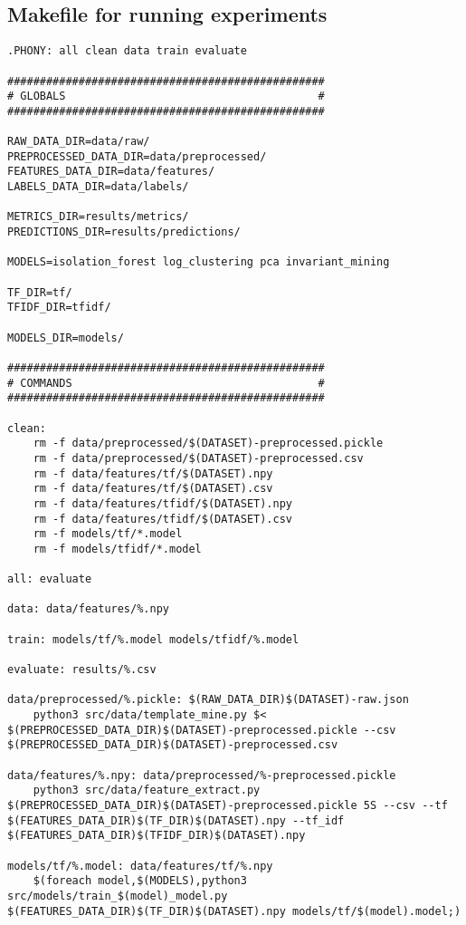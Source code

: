 \subsection{Makefile for running experiments}
\label{appendix:makefile}

\lstset{language=[gnu] make}
\begin{lstlisting}
.PHONY: all clean data train evaluate

#################################################
# GLOBALS                                       #
#################################################

RAW_DATA_DIR=data/raw/
PREPROCESSED_DATA_DIR=data/preprocessed/
FEATURES_DATA_DIR=data/features/
LABELS_DATA_DIR=data/labels/

METRICS_DIR=results/metrics/
PREDICTIONS_DIR=results/predictions/

MODELS=isolation_forest log_clustering pca invariant_mining 

TF_DIR=tf/
TFIDF_DIR=tfidf/

MODELS_DIR=models/

#################################################
# COMMANDS                                      #
#################################################

clean:
	rm -f data/preprocessed/$(DATASET)-preprocessed.pickle
	rm -f data/preprocessed/$(DATASET)-preprocessed.csv
	rm -f data/features/tf/$(DATASET).npy
	rm -f data/features/tf/$(DATASET).csv
	rm -f data/features/tfidf/$(DATASET).npy
	rm -f data/features/tfidf/$(DATASET).csv
	rm -f models/tf/*.model
	rm -f models/tfidf/*.model

all: evaluate

data: data/features/%.npy

train: models/tf/%.model models/tfidf/%.model

evaluate: results/%.csv

data/preprocessed/%.pickle: $(RAW_DATA_DIR)$(DATASET)-raw.json
	python3 src/data/template_mine.py $< $(PREPROCESSED_DATA_DIR)$(DATASET)-preprocessed.pickle --csv $(PREPROCESSED_DATA_DIR)$(DATASET)-preprocessed.csv

data/features/%.npy: data/preprocessed/%-preprocessed.pickle
	python3 src/data/feature_extract.py $(PREPROCESSED_DATA_DIR)$(DATASET)-preprocessed.pickle 5S --csv --tf $(FEATURES_DATA_DIR)$(TF_DIR)$(DATASET).npy --tf_idf $(FEATURES_DATA_DIR)$(TFIDF_DIR)$(DATASET).npy

models/tf/%.model: data/features/tf/%.npy
	$(foreach model,$(MODELS),python3 src/models/train_$(model)_model.py $(FEATURES_DATA_DIR)$(TF_DIR)$(DATASET).npy models/tf/$(model).model;)


\end{lstlisting}
